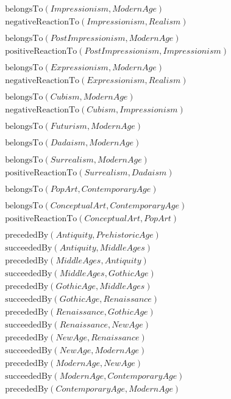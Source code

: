 \documentclass[a4paper, 11pt]{article}
\begin{document}
\begin{align*}
  &\text{belongsTo}(Impressionism, ModernAge) \\
  &\text{negativeReactionTo}(Impressionism, Realism)\\\\
  &\text{belongsTo}(PostImpressionism, ModernAge) \\
  &\text{positiveReactionTo}(PostImpressionism, Impressionism)\\\\
  &\text{belongsTo}(Expressionism, ModernAge) \\
  &\text{negativeReactionTo}(Expressionism, Realism)\\\\
  &\text{belongsTo}(Cubism, ModernAge) \\
  &\text{negativeReactionTo}(Cubism, Impressionism)\\\\
  &\text{belongsTo}(Futurism, ModernAge)\\\\
  &\text{belongsTo}(Dadaism, ModernAge)\\\\
  &\text{belongsTo}(Surrealism, ModernAge) \\
  &\text{positiveReactionTo}(Surrealism, Dadaism)\\\\
  &\text{belongsTo}(PopArt, ContemporaryAge) \\\\
  &\text{belongsTo}(ConceptualArt, ContemporaryAge) \\
  &\text{positiveReactionTo}(ConceptualArt, PopArt) \\\\
  &\text{precededBy}(Antiquity, PrehistoricAge) \\
  &\text{succeededBy}(Antiquity, MiddleAges) \\
  &\text{precededBy}(MiddleAges, Antiquity) \\
  &\text{succeededBy}(MiddleAges, GothicAge) \\
  &\text{precededBy}(GothicAge, MiddleAges) \\
  &\text{succeededBy}(GothicAge, Renaissance) \\
  &\text{precededBy}(Renaissance, GothicAge) \\
  &\text{succeededBy}(Renaissance, NewAge) \\
  &\text{precededBy}(NewAge, Renaissance) \\
  &\text{succeededBy}(NewAge, ModernAge) \\
  &\text{precededBy}(ModernAge, NewAge) \\
  &\text{succeededBy}(ModernAge, ContemporaryAge) \\
  &\text{precededBy}(ContemporaryAge, ModernAge)
\end{align*}
\end{document}
